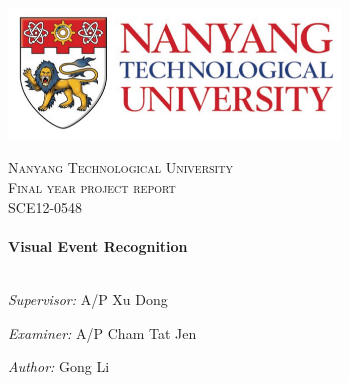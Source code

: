 
\begin{titlepage}
\begin{center}

\includegraphics[width = 0.66\textwidth]{ntu_logo}

\textsc{\LARGE Nanyang Technological University}\\[1.5cm]

\textsc{\Large Final year project report}\\[1.2cm]
\textsc{\Large SCE12-0548}\\[0.6cm]

\HRule \\[0.4cm]
{ \huge \bfseries Visual Event Recognition\\[0.4cm] }
\HRule \\[1.2cm]


\begin{minipage}{0.5\textwidth}
\begin{flushleft} \large
\emph{Supervisor:}
A/P Xu Dong
\end{flushleft}
\end{minipage}



\vspace{4 mm} 

\begin{minipage}{0.5\textwidth}
\begin{flushleft} \large
\emph{Examiner:}
A/P Cham Tat Jen
\end{flushleft}
\end{minipage}

\vspace{4 mm}

\begin{minipage}{0.5\textwidth}
\begin{flushleft} \large
\emph{Author:}
Gong Li
\end{flushleft}
\end{minipage}



\end{center}
\end{titlepage}
